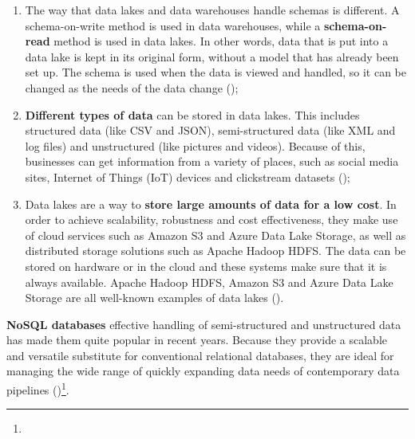 \begin{enumerate}
    \item The way that data lakes and data warehouses handle schemas is different. A schema-on-write method is used in data warehouses, while a \textbf{schema-on-read} method is used in data lakes. In other words, data that is put into a data lake is kept in its original form, without a model that has already been set up. The schema is used when the data is viewed and handled, so it can be changed as the needs of the data change (\cite{Nambiar2022AnOO})\footnotemark[20];
    \item \textbf{Different types of data} can be stored in data lakes. This includes structured data (like CSV and JSON), semi-structured data (like XML and log files) and unstructured (like pictures and videos). Because of this, businesses can get information from a variety of places, such as social media sites, Internet of Things (IoT) devices and clickstream datasets (\cite{Nambiar2022AnOO})\footnotemark[20];
    \item Data lakes are a way to \textbf{store large amounts of data for a low cost}. In order to achieve scalability, robustness and cost effectiveness, they make use of cloud services such as Amazon S3 and Azure Data Lake Storage, as well as distributed storage solutions such as Apache Hadoop HDFS. The data can be stored on hardware or in the cloud and these systems make sure that it is always available. Apache Hadoop HDFS, Amazon S3 and Azure Data Lake Storage are all well-known examples of data lakes (\cite{Nambiar2022AnOO})\footnotemark[20].
\end{enumerate}

\textbf{NoSQL databases} effective handling of semi-structured and unstructured data has made them quite popular in recent years. Because they provide a scalable and versatile substitute for conventional relational databases, they are ideal for managing the wide range of quickly expanding data needs of contemporary data pipelines (\cite{Nayak2013TypeON})\footnote[21]{}.

